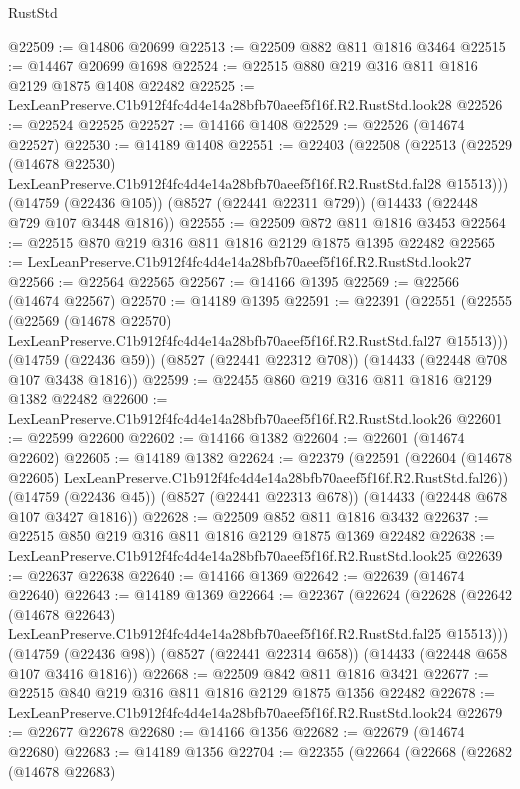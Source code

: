 \begin{lexlean}{RustStd}
\begin{coremodule}
@22509 := @14806 @20699
@22513 := @22509 @882 @811 @1816 @3464
@22515 := @14467 @20699 @1698
@22524 := @22515 @880 @219 @316 @811 @1816 @2129 @1875 @1408 @22482
@22525 := LexLeanPreserve.C1b912f4fc4d4e14a28bfb70aeef5f16f.R2.RustStd.look28
@22526 := @22524 @22525
@22527 := @14166 @1408
@22529 := @22526 (@14674 @22527)
@22530 := @14189 @1408
@22551 := @22403
    (@22508
      (@22513
        (@22529
          (@14678 @22530)
          LexLeanPreserve.C1b912f4fc4d4e14a28bfb70aeef5f16f.R2.RustStd.fal28
          @15513)))
    (@14759 (@22436 @105))
    (@8527 (@22441 @22311 @729))
    (@14433 (@22448 @729 @107 @3448 @1816))
@22555 := @22509 @872 @811 @1816 @3453
@22564 := @22515 @870 @219 @316 @811 @1816 @2129 @1875 @1395 @22482
@22565 := LexLeanPreserve.C1b912f4fc4d4e14a28bfb70aeef5f16f.R2.RustStd.look27
@22566 := @22564 @22565
@22567 := @14166 @1395
@22569 := @22566 (@14674 @22567)
@22570 := @14189 @1395
@22591 := @22391
    (@22551
      (@22555
        (@22569
          (@14678 @22570)
          LexLeanPreserve.C1b912f4fc4d4e14a28bfb70aeef5f16f.R2.RustStd.fal27
          @15513)))
    (@14759 (@22436 @59))
    (@8527 (@22441 @22312 @708))
    (@14433 (@22448 @708 @107 @3438 @1816))
@22599 := @22455 @860 @219 @316 @811 @1816 @2129 @1382 @22482
@22600 := LexLeanPreserve.C1b912f4fc4d4e14a28bfb70aeef5f16f.R2.RustStd.look26
@22601 := @22599 @22600
@22602 := @14166 @1382
@22604 := @22601 (@14674 @22602)
@22605 := @14189 @1382
@22624 := @22379
    (@22591
      (@22604 (@14678 @22605) LexLeanPreserve.C1b912f4fc4d4e14a28bfb70aeef5f16f.R2.RustStd.fal26))
    (@14759 (@22436 @45))
    (@8527 (@22441 @22313 @678))
    (@14433 (@22448 @678 @107 @3427 @1816))
@22628 := @22509 @852 @811 @1816 @3432
@22637 := @22515 @850 @219 @316 @811 @1816 @2129 @1875 @1369 @22482
@22638 := LexLeanPreserve.C1b912f4fc4d4e14a28bfb70aeef5f16f.R2.RustStd.look25
@22639 := @22637 @22638
@22640 := @14166 @1369
@22642 := @22639 (@14674 @22640)
@22643 := @14189 @1369
@22664 := @22367
    (@22624
      (@22628
        (@22642
          (@14678 @22643)
          LexLeanPreserve.C1b912f4fc4d4e14a28bfb70aeef5f16f.R2.RustStd.fal25
          @15513)))
    (@14759 (@22436 @98))
    (@8527 (@22441 @22314 @658))
    (@14433 (@22448 @658 @107 @3416 @1816))
@22668 := @22509 @842 @811 @1816 @3421
@22677 := @22515 @840 @219 @316 @811 @1816 @2129 @1875 @1356 @22482
@22678 := LexLeanPreserve.C1b912f4fc4d4e14a28bfb70aeef5f16f.R2.RustStd.look24
@22679 := @22677 @22678
@22680 := @14166 @1356
@22682 := @22679 (@14674 @22680)
@22683 := @14189 @1356
@22704 := @22355
    (@22664
      (@22668
        (@22682
          (@14678 @22683)

\end{coremodule}
\end{lexlean}
